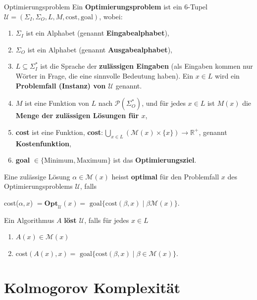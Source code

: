 \documentclass[a4paper, 11pt]{article}
\def\R{\mathbb{R}}
\begin{document}
	\begin{mainbox}{Optimierungsproblem}
		Ein \textbf{Optimierungsproblem} ist ein $6$-Tupel $\mathcal{U} = (\Sigma_I, \Sigma_O, L, M, \text{cost}, \text{goal})$, wobei:
		\begin{enumerate}[label=(\roman*)]
			\item $\Sigma_I$ ist ein Alphabet (genannt \textbf{Eingabealphabet}),
			\item $\Sigma_O$ ist ein Alphabet (genannt \textbf{Ausgabealphabet}),
			\item $L \subseteq \Sigma_I^*$ ist die Sprache der \textbf{zulässigen Eingaben} (als Eingaben kommen nur Wörter in Frage, die eine sinnvolle Bedeutung haben). 
			Ein $x \in L$ wird ein \textbf{Problemfall (Instanz) von $\mathcal{U}$} genannt.
			\item $M$ ist eine Funktion von $L$ nach $\mathcal{P}(\Sigma_O^*)$, und für jedes $x \in L$ ist $M(x)$ die \textbf{Menge der zulässigen Lösungen für $x$},
			\item \textbf{cost} ist eine Funktion, \textbf{cost}$: \bigcup_{x \in L}(\mathcal{M}(x)\times\{x\}) \to \R^+$, genannt \textbf{Kostenfunktion},
			\item \textbf{goal} $\in \{\text{Minimum}, \text{Maximum}\}$ ist das \textbf{Optimierungsziel}.
		\end{enumerate}	
        Eine zulässige Lösung $\alpha \in \mathcal{M}(x)$ heisst \textbf{optimal} für den Problemfall $x$ des Optimierungsproblems $\mathcal{U}$, falls 
		\begin{center}
			cost($\alpha, x$) $= \textbf{Opt}_\mathcal{U}(x) = \text{ goal}\{\text{cost}(\beta, x) \mid \beta \mathcal{M}(x)\}$.
		\end{center}
		Ein Algorithmus $A$ \textbf{löst $\mathcal{U}$}, falls für jedes $x \in L$
		\begin{enumerate}[label=(\roman*)]
			\item $A(x) \in \mathcal{M}(x)$
			\item cost$(A(x), x) = \text{ goal}\{\text{cost}(\beta, x) \mid \beta \in \mathcal{M}(x)\}$.
		\end{enumerate} 
	\end{mainbox}

    \section{Kolmogorov Komplexität}
\end{document}
